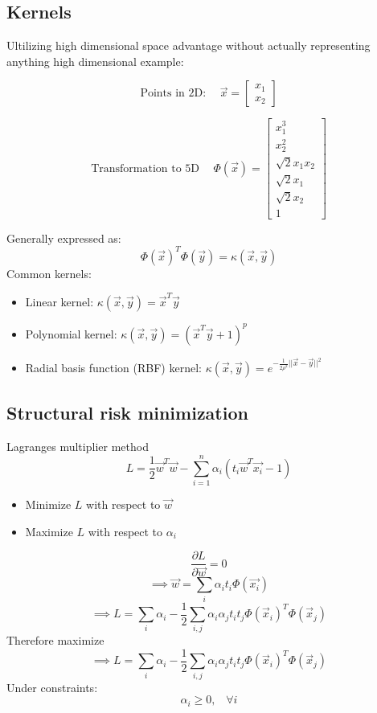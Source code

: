 \documentclass[12pt,a4paper]{article}
\begin{document}
\subsection{Kernels}
Ultilizing high dimensional space advantage without actually representing anything high dimensional example:


\[
\text{Points in 2D:}
\hspace{15pt}
\vec{x} = \begin{bmatrix} x_1 \\ x_2 \end{bmatrix}
\]

\[
\text{Transformation to 5D}
\hspace{15pt}
\Phi(\vec{x}) = \begin{bmatrix} x_1^3 \\ x_2^2 \\ \sqrt{2}x_1x_2 \\ \sqrt{2}x_1 \\ \sqrt{2}x_2 \\ 1 \end{bmatrix}
\]

Generally expressed as:
\[
\Phi(\vec{x})^T \Phi(\vec{y}) = \kappa(\vec{x}, \vec{y})
\]
Common kernels:
\begin{itemize}
    \item Linear kernel: $\kappa(\vec{x}, \vec{y}) = \vec{x}^T \vec{y}$
    \item Polynomial kernel: $\kappa(\vec{x}, \vec{y}) = (\vec{x}^T \vec{y} + 1)^p$
    \item Radial basis function (RBF) kernel: $\kappa(\vec{x}, \vec{y}) = e^{-\frac{1}{2 \rho^2} ||\vec{x} - \vec{y}||^2}$
\end{itemize}

\subsection{Structural risk minimization}
Lagranges multiplier method
\[
L = \frac{1}{2} \vec{w}^T \vec{w} - \sum_{i=1}^n \alpha_i (t_i \vec{w}^T \vec{x_i} - 1)
\]
\begin{itemize}
    \item Minimize $L$ with respect to $\vec{w}$
    \item Maximize $L$ with respect to $\alpha_i$
\end{itemize}

\[
\frac{\partial L}{\partial \vec{w}} = 0 
\]
\[
\implies \vec{w} = \sum_i \alpha_i t_i \Phi(\vec{x_i})
\]
\[
\implies L = \sum_i \alpha_i - \frac{1}{2} \sum_{i,j} \alpha_i \alpha_j t_i t_j \Phi(\vec{x}_i)^T \Phi(\vec{x}_j)
\]
Therefore maximize 
\[\implies L = \sum_i \alpha_i - \frac{1}{2} \sum_{i,j} \alpha_i \alpha_j t_i t_j \Phi(\vec{x}_i)^T \Phi(\vec{x}_j)
\]
Under constraints:
\[
\alpha_i \geq 0, \hspace{10pt} \forall i
\]
\end{document}
